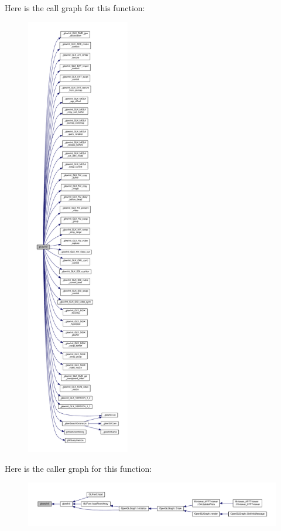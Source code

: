 Here is the call graph for this function\+:
\nopagebreak
\begin{figure}[H]
\begin{center}
\leavevmode
\includegraphics[height=550pt]{d5/d82/glxew_8h_a836a129967caded0c3dc75e1e7424ca3_cgraph}
\end{center}
\end{figure}




Here is the caller graph for this function\+:
\nopagebreak
\begin{figure}[H]
\begin{center}
\leavevmode
\includegraphics[width=350pt]{d5/d82/glxew_8h_a836a129967caded0c3dc75e1e7424ca3_icgraph}
\end{center}
\end{figure}


